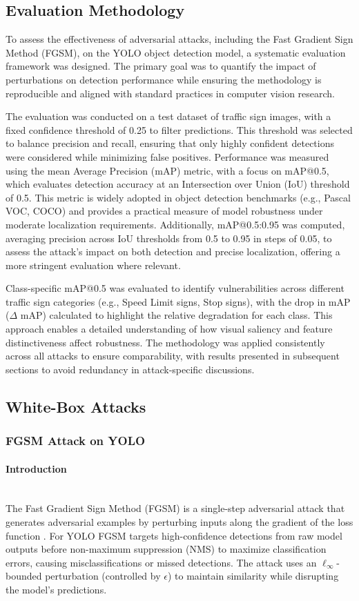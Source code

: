 \documentclass[../main.tex]{subfiles}
\begin{document}
\subsection{Evaluation Methodology}
To assess the effectiveness of adversarial attacks, including the Fast Gradient Sign Method (FGSM), on the YOLO object detection model, a systematic evaluation framework was designed. The primary goal was to quantify the impact of perturbations on detection performance while ensuring the methodology is reproducible and aligned with standard practices in computer vision research.

The evaluation was conducted on a test dataset of traffic sign images, with a fixed confidence threshold of 0.25 to filter predictions. This threshold was selected to balance precision and recall, ensuring that only highly confident detections were considered while minimizing false positives. Performance was measured using the mean Average Precision (mAP) metric, with a focus on mAP@0.5, which evaluates detection accuracy at an Intersection over Union (IoU) threshold of 0.5. This metric is widely adopted in object detection benchmarks (e.g., Pascal VOC, COCO) and provides a practical measure of model robustness under moderate localization requirements. Additionally, mAP@0.5:0.95 was computed, averaging precision across IoU thresholds from 0.5 to 0.95 in steps of 0.05, to assess the attack's impact on both detection and precise localization, offering a more stringent evaluation where relevant.

Class-specific mAP@0.5 was evaluated to identify vulnerabilities across different traffic sign categories (e.g., Speed Limit signs, Stop signs), with the drop in mAP ($\Delta$ mAP) calculated to highlight the relative degradation for each class. This approach enables a detailed understanding of how visual saliency and feature distinctiveness affect robustness. The methodology was applied consistently across all attacks to ensure comparability, with results presented in subsequent sections to avoid redundancy in attack-specific discussions.
\subsection{White-Box Attacks}
\subsubsection{FGSM Attack on YOLO}

\paragraph{Introduction}\leavevmode\\
The Fast Gradient Sign Method (FGSM) is a single-step adversarial attack that generates adversarial examples by perturbing inputs along the gradient of the loss function \cite{goodfellow2015explaining}. For YOLO FGSM targets high-confidence detections from raw model outputs before non-maximum suppression (NMS) to maximize classification errors, causing misclassifications or missed detections. The attack uses an $\ell_\infty$-bounded perturbation (controlled by $\epsilon$) to maintain similarity while disrupting the model's predictions.
\end{document}
